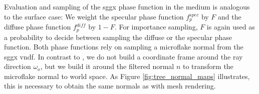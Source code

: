 Evaluation and sampling of the \ac{sggx} phase function in the medium is analogous to the surface case: We weight the specular phase function $f{}^{spec}_p$ by $F$ and the diffuse phase function $f{}^{diff}_p$ by $1-F$.
For importance sampling, $F$ is again used as a probability to decide between sampling the diffuse or the specular phase function.
Both phase functions rely on sampling a microflake normal from the \ac{sggx} \acl{vndf}.
In contrast to \citeauthor{sggx} \cite{sggx}, we do not build a coordinate frame around the ray direction $\omega_o$, but we build it around the filtered normal $n$ to transform the microflake normal to world space.
As Figure \ref{fig:tree_normal_maps} illustrates, this is necessary to obtain the same normals as with mesh rendering.
